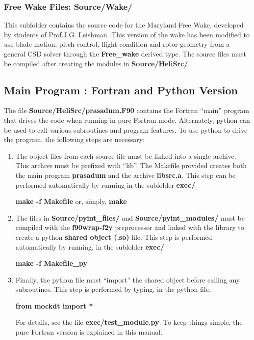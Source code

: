 \subsubsection{Free Wake Files: Source/Wake/}
This subfolder contains the source code for the Maryland Free Wake, developed by students of Prof.J.G. Leishman. This version of the wake has been modified to use blade motion, pitch control, flight condition and rotor geometry from a general CSD solver through the \textbf{Free\_wake} derived type. The source files must be compiled after creating the modules in \textbf{Source/HeliSrc/}.

\subsection{\textbf{Main Program : Fortran and Python Version}}
The file \textbf{Source/HeliSrc/prasadum.F90} contains the Fortran ``main'' program that drives the code when running in pure Fortran mode. Alternately, python can be used to call various subroutines and program features. To use python to drive the program, the following steps are necessary:
\begin{enumerate}
\item The object files from each source file must be linked into a single archive. This archive must be prefixed with ``lib''. The Makefile provided creates both the main program \textbf{prasadum} and the archive \textbf{libsrc.a}. This step can be performed automatically by running in the subfolder \textbf{exec/}
\begin{center}
\qquad \qquad \textbf{make -f Makefile} \qquad or, simply, \textbf{make}
\end{center}
\item The files in \textbf{Source/pyint\_files/} and \textbf{Source/pyint\_modules/} must be compiled with the \textbf{f90wrap-f2y} preprocessor and linked with the library to create a python \textbf{shared object (.so)} file. This step is performed automatically by running, in the subfolder \textbf{exec/}
\begin{center}
\textbf{make -f Makefile\_py}
\end{center}
\item Finally, the python file must ``import'' the shared object before calling any subroutines. This step is performed by typing, in the python file,
\begin{center}
\textbf{from mockdt import *}
\end{center}
For details, see the file \textbf{exec/test\_module.py}. To keep things simple, the pure Fortran version is explained in this manual.
\end{enumerate}

